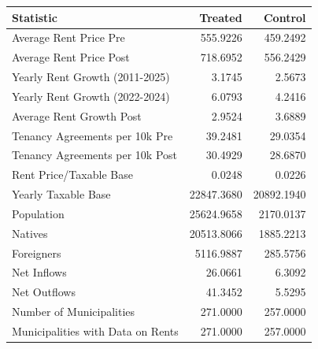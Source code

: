 \begin{tabular}{lrr}
\toprule
Statistic & Treated & Control \\
\midrule
Average Rent Price Pre & 555.9226 & 459.2492 \\
Average Rent Price Post & 718.6952 & 556.2429 \\
Yearly Rent Growth (2011-2025) & 3.1745 & 2.5673 \\
Yearly Rent Growth (2022-2024) & 6.0793 & 4.2416 \\
Average Rent Growth Post & 2.9524 & 3.6889 \\
Tenancy Agreements per 10k Pre & 39.2481 & 29.0354 \\
Tenancy Agreements per 10k Post & 30.4929 & 28.6870 \\
Rent Price/Taxable Base & 0.0248 & 0.0226 \\
Yearly Taxable Base & 22847.3680 & 20892.1940 \\
Population & 25624.9658 & 2170.0137 \\
Natives & 20513.8066 & 1885.2213 \\
Foreigners & 5116.9887 & 285.5756 \\
Net Inflows & 26.0661 & 6.3092 \\
Net Outflows & 41.3452 & 5.5295 \\
Number of Municipalities & 271.0000 & 257.0000 \\
Municipalities with Data on Rents & 271.0000 & 257.0000 \\
\bottomrule
\end{tabular}
